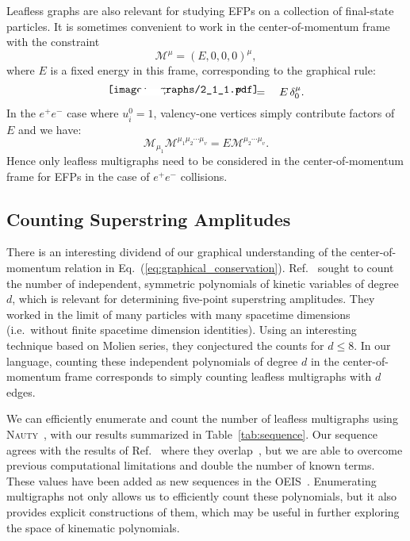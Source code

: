 \documentclass[aps,prd,floatfix,preprintnumbers,twocolumn,groupedaddress,nofootinbib,longbibliography,10pt]{revtex4-1}
\DeclareRobustCommand{\Tab}[1]{Table~\ref{#1}}
\DeclareRobustCommand{\Eq}[1]{Eq.~(\ref{#1})}
\DeclareRobustCommand{\Ref}[1]{Ref.~\cite{#1}}
\begin{document}
Leafless graphs are also relevant for studying EFPs on a collection of final-state particles.
%
It is sometimes convenient to work in the center-of-momentum frame with the constraint
%
\begin{equation}
\mathcal M^\mu = (E,0,0,0)^\mu,
\end{equation}
%
where $E$ is a fixed energy in this frame, corresponding to the graphical rule:
%
\begin{equation}
\begin{tikzpicture}[      
        every node/.style={anchor=south west,inner sep=0pt},
        x=1mm, y=1mm,
      ]   
     \node (fig2) at (3,3)
       {\texttt{[image: graphs/2\_1\_1.pdf]}};  
     \draw [fill=patchcolor,patchcolor] (13, 3) rectangle (21, 5);
\end{tikzpicture}
\hspace{-7mm}
{}^\mu
\quad
= 
\quad
     E
     \,
\delta_0^\mu.
\end{equation}
%
In the $e^+e^-$ case where $u^0_i = 1$, valency-one vertices simply contribute factors of $E$ and we have:
%
\begin{equation}
\mathcal M_{\mu_1}\mathcal M^{\mu_1\mu_2\cdots\mu_v} = E \mathcal M^{\mu_2\cdots\mu_v}.
\end{equation}
%
Hence only leafless multigraphs need to be considered in the center-of-momentum frame for EFPs in the case of $e^+e^-$ collisions.


\subsection{Counting Superstring Amplitudes}


There is an interesting dividend of our graphical understanding of the center-of-momentum relation in \Eq{eq:graphical_conservation}.
%
\Ref{Boels:2013jua} sought to count the number of independent, symmetric polynomials of kinetic variables of degree $d$, which is relevant for determining five-point superstring amplitudes.
%
They worked in the limit of many particles with many spacetime dimensions (i.e.~without finite spacetime dimension identities).
%
Using an interesting technique based on Molien series, they conjectured the counts for $d\le 8$.
%
In our language, counting these independent polynomials of degree $d$ in the center-of-momentum frame corresponds to simply counting leafless multigraphs with $d$ edges.


We can efficiently enumerate and count the number of leafless multigraphs using \textsc{Nauty}~\cite{McKay201494}, with our results summarized in \Tab{tab:sequence}.
%
Our sequence agrees with the results of \Ref{Boels:2013jua} where they overlap~\cite{oeisA226919}, but we are able to overcome previous computational limitations and double the number of known terms.
%
These values have been added as new sequences in the OEIS~\cite{oeisA307317,oeisA307316}.
%
Enumerating multigraphs not only allows us to efficiently count these polynomials, but it also provides explicit constructions of them, which may be useful in further exploring the space of kinematic polynomials.
\end{document}

